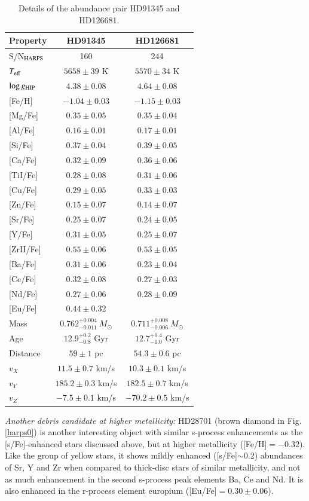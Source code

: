 \documentclass{aa}  %
\begin{document}
\begin{table}
\label{twintable}
\centering
\caption{Details of the abundance pair HD91345 and HD126681.}
\begin{tabular}{lcc}
Property & HD91345 & HD126681 \\
\hline \hline
S/N$_{\rm HARPS}$ & 160 & 244 \\
$T_{\rm eff}$ & $5658\pm39$ K & $5570\pm34$ K \\
$\log g_{\rm HIP}$ & $4.38\pm0.08$ & $4.64\pm0.08$ \\
{[Fe/H]  }& $-1.04\pm0.03$ & $-1.15\pm0.03$ \\
{[Mg/Fe] }& $0.35\pm0.05$ & $0.35\pm0.04$ \\
{[Al/Fe] }& $0.16\pm0.01$ & $0.17\pm0.01$ \\
{[Si/Fe] }& $0.37\pm0.04$ & $0.39\pm0.05$ \\
{[Ca/Fe] }& $0.32\pm0.09$ & $0.36\pm0.06$ \\
{[TiI/Fe]} & $0.28\pm0.08$ & $0.31\pm0.06$ \\
{[Cu/Fe] }& $0.29\pm0.05$ & $0.33\pm0.03$ \\
{[Zn/Fe] }& $0.15\pm0.07$ & $0.14\pm0.07$ \\
{[Sr/Fe] }& $0.25\pm0.07$ & $0.24\pm0.05$ \\
{[Y/Fe]  }& $0.31\pm0.05$ & $0.25\pm0.07$ \\
{[ZrII/Fe]} & $0.55\pm0.06$ & $0.53\pm0.05$ \\
{[Ba/Fe]} & $0.31\pm0.06$ & $0.23\pm0.04$ \\
{[Ce/Fe]} & $0.32\pm0.08$ & $0.27\pm0.03$ \\
{[Nd/Fe]} & $0.27\pm0.06$ & $0.28\pm0.09$ \\
{[Eu/Fe]} & $0.44\pm0.32$ &  \\
\hline
Mass & $0.762^{+0.004}_{-0.011}\ M_{\odot}$  & $0.711^{+0.008}_{-0.006}\ M_{\odot}$ \\
Age & $12.9^{+0.2}_{-0.8}$ Gyr & $12.7^{+0.4}_{-1.0}$ Gyr \\
Distance & $59\pm1$ pc & $54.3\pm0.6$ pc\\
$v_X$ & $11.5\pm0.7$ km/s & $10.3\pm0.1$ km/s \\
$v_Y$ & $185.2\pm0.3$ km/s & $182.5\pm0.7$ km/s \\
$v_Z$ & $-7.5\pm0.1$ km/s & $-70.2\pm0.5$ km/s \\
\hline\hline
\end{tabular}
\end{table}

{\it Another debris candidate at higher metallicity:} HD28701 (brown diamond in Fig. \ref{harps0}) is another interesting object with similar s-process enhancements as the [s/Fe]-enhanced stars discussed above, but at higher metallicity ([Fe/H]$=-0.32$). Like the group of yellow stars, it shows mildly enhanced ([s/Fe]$\sim0.2$) abundances of Sr, Y and Zr when compared to thick-disc stars of similar metallicity, and not as much enhancement in the second s-process peak elements Ba, Ce and Nd. It is also enhanced in the r-process element europium ([Eu/Fe]$=0.30\pm0.06$). 
\end{document}
